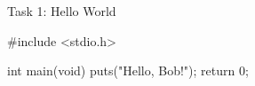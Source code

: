 \documentclass[10pt,graphics,aspectratio=169,table]{beamer}
\begin{document}
\begin{frame}[fragile]{Task 1: Hello World}
\begin{codeblock}
#include <stdio.h>

int main(void){
    puts("Hello, Bob!");
    return 0;
}
\end{codeblock}
\end{frame}
\end{document}

